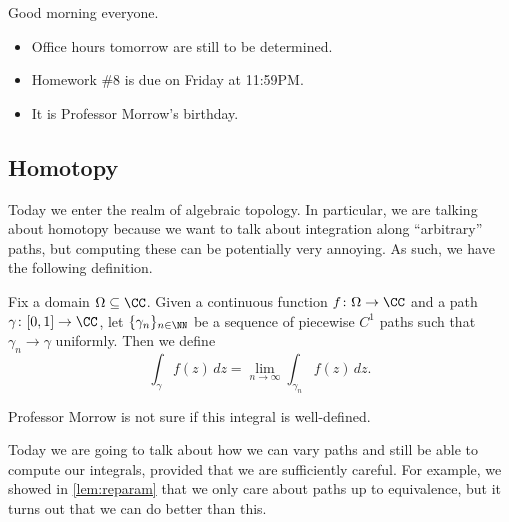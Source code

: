 
Good morning everyone.
\begin{itemize}
	\item Office hours tomorrow are still to be determined.
	\item Homework \#8 is due on Friday at 11:59PM.
	\item It is Professor Morrow's birthday.
\end{itemize}

\subsection{Homotopy}
Today we enter the realm of algebraic topology. In particular, we are talking about homotopy because we want to talk about integration along ``arbitrary'' paths, but computing these can be potentially very annoying.
\usepiecewisecone*
As such, we have the following definition.
\begin{definition}
	Fix a domain $\Omega\subseteq\CC$. Given a continuous function $f\colon \Omega\to\CC$ and a path $\gamma\colon [0,1]\to\CC$, let $\{\gamma_n\}_{n\in\NN}$ be a sequence of piecewise $C^1$ paths such that $\gamma_n\to\gamma$ uniformly. Then we define
	\[\int_\gamma f(z)\,dz=\lim_{n\to\infty}\int_{\gamma_n}f(z)\,dz.\]
\end{definition}
\begin{remark}
	Professor Morrow is not sure if this integral is well-defined.
\end{remark}
Today we are going to talk about how we can vary paths and still be able to compute our integrals, provided that we are sufficiently careful. For example, we showed in \autoref{lem:reparam} that we only care about paths up to equivalence, but it turns out that we can do better than this.

